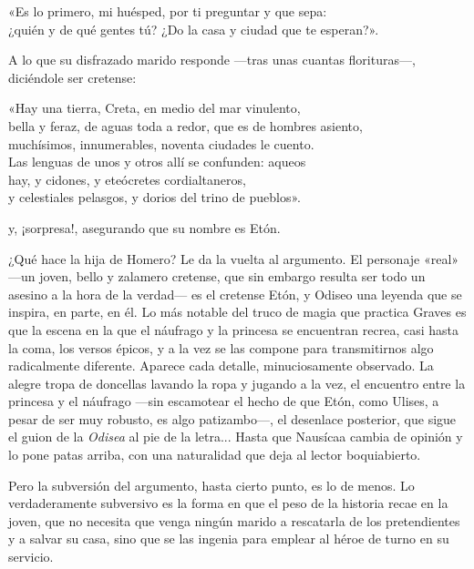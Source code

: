 \begin{versocita}
«Es lo primero, mi huésped, por ti preguntar y que sepa:\\
¿quién y de qué gentes tú? ¿Do la casa y ciudad que te esperan?».
\end{versocita}

A lo que su disfrazado marido responde ---tras unas cuantas florituras---, diciéndole ser cretense:

\begin{versocita}
«Hay una tierra, Creta, en medio del mar vinulento,\\
bella y feraz, de aguas toda a redor, que es de hombres asiento,\\
muchísimos, innumerables, noventa ciudades le cuento.\\
Las lenguas de unos y otros allí se confunden: aqueos\\
hay, y cidones, y eteócretes cordialtaneros,\\
y celestiales pelasgos, y dorios del trino de pueblos».
\end{versocita}

y, ¡sorpresa!, asegurando que su nombre es Etón.

¿Qué hace la hija de Homero? Le da la vuelta al argumento. El personaje «real» ---un joven, bello y zalamero cretense, que sin embargo resulta ser todo un asesino a la hora de la verdad--- es el cretense Etón, y Odiseo una leyenda que se inspira, en parte, en él. Lo más notable del truco de magia que practica Graves es que la escena en la que el náufrago y la princesa se encuentran recrea, casi hasta la coma, los versos épicos, y a la vez se las compone para transmitirnos algo radicalmente diferente. Aparece cada detalle, minuciosamente observado. La alegre tropa de doncellas lavando la ropa y jugando a la vez, el encuentro entre la princesa y el náufrago ---sin escamotear el hecho de que Etón, como Ulises, a pesar de ser muy robusto, es algo patizambo---, el desenlace posterior, que sigue el guion de la \emph{Odisea} al pie de la letra... Hasta que Nausícaa cambia de opinión y lo pone patas arriba, con una naturalidad que deja al lector boquiabierto.

Pero la subversión del argumento, hasta cierto punto, es lo de menos. Lo verdaderamente subversivo es la forma en que el peso de la historia recae en la joven, que no necesita que venga ningún marido a rescatarla de los pretendientes y a salvar su casa, sino que se las ingenia para emplear al héroe de turno en su servicio.

